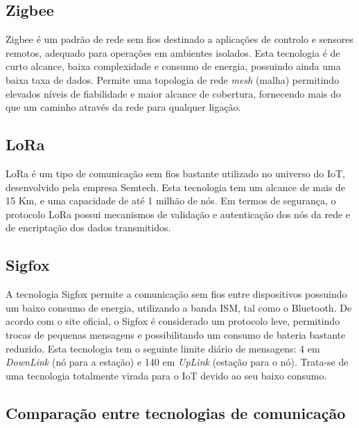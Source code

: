 \subsection{Zigbee}


Zigbee é um padrão de rede sem fios destinado a aplicações de controlo e sensores remotos, adequado para operações em ambientes isolados. Esta tecnologia é de curto alcance, baixa complexidade e consumo de energia, possuindo ainda uma baixa taxa de dados. Permite uma topologia de rede \textit{mesh} (malha) permitindo elevados níveis de fiabilidade e maior alcance de cobertura, fornecendo mais do que um caminho através da rede para qualquer ligação\cite{Rahman2015}. 


\subsection{LoRa}

\ac{LoRa} é um tipo de comunicação sem fios bastante utilizado no universo do \ac{IoT}, desenvolvido pela empresa Semtech. Esta tecnologia tem um alcance de mais de 15 Km, e uma capacidade de até 1 milhão de nós. Em termos de segurança, o protocolo LoRa possui mecanismos de validação e autenticação dos nós da rede e de encriptação dos dados transmitidos\cite{LinkLabs2015}\cite{Semtech2017}. 





\subsection{Sigfox}


A tecnologia Sigfox permite a comunicação sem fios entre dispositivos possuindo um baixo consumo de energia, utilizando a banda \ac{ISM}, tal como o Bluetooth. De acordo com o site oficial, o Sigfox é considerado um protocolo leve, permitindo trocas de pequenas mensagens e possibilitando um consumo de bateria bastante reduzido. Esta tecnologia tem o seguinte limite diário de mensagens: 4 em \textit{DownLink} (nó para a estação) e 140 em \textit{UpLink} (estação para o nó)\cite{sigfoxsite}. Trata-se de uma tecnologia totalmente virada para o \ac{IoT} devido ao seu baixo consumo. 




\subsection{Comparação entre tecnologias de comunicação}

